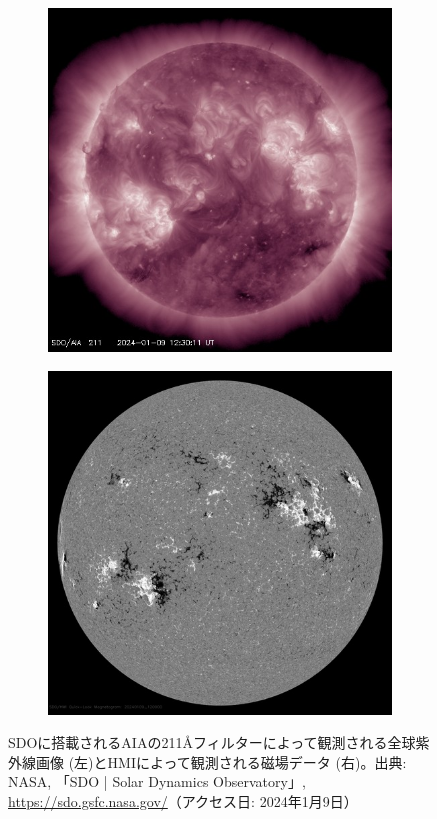   \begin{figure}[htbp]
    \begin{subfigure}{0.5\textwidth}
      \centering
      \includegraphics[width=\textwidth]{figures/latest_512_0211.jpg}
    \end{subfigure}
    \begin{subfigure}{0.5\textwidth}
      \centering
      \includegraphics[width=\textwidth]{figures/latest_512_HMIB.jpg}
    \end{subfigure}
    \caption[SDO]{SDOに搭載されるAIAの211\AA フィルターによって観測される全球紫外線画像 (左)とHMIによって観測される磁場データ (右)。出典: NASA, 「SDO | Solar Dynamics Observatory」, \url{https://sdo.gsfc.nasa.gov/}（アクセス日: 2024年1月9日）}
    \label{fig:sdo_axmple}
  \end{figure}
  
